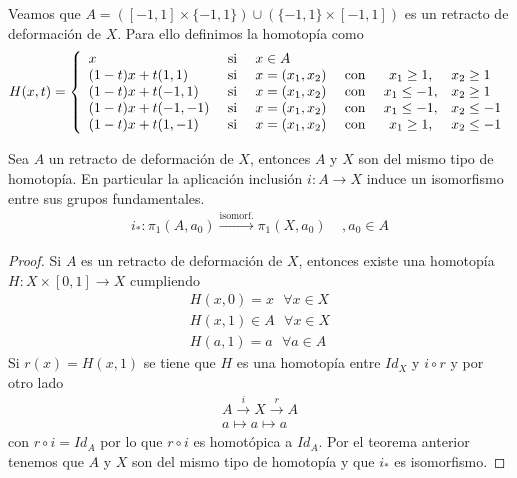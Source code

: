 \begin{ejemplo}
\begin{enumerate}
\begin{figure}[H]
\begin{tikzpicture}[scale=0.8]
            \end{tikzpicture}
        \end{figure}

        Veamos que $A=([-1,1]\times \{-1,1\})\cup (\{-1,1\}\times [-1,1])$ es un retracto de deformación de $X$. Para ello definimos la homotopía como 
        \begin{gather*}
            H(x,t) = \left\{
                \begin{array}{l c l l c l }
                    x & \text{ si } & x\in A\\
                    (1-t)x+t(1,1) & \text{ si } & x=(x_1,x_2)& \text{ con } &x_1\geq 1,& x_2\geq 1 \\
                    (1-t)x+t(-1,1) & \text{ si } & x=(x_1,x_2)& \text{ con } &x_1\leq -1,& x_2\geq 1 \\
                    (1-t)x+t(-1,-1) & \text{ si } & x=(x_1,x_2)& \text{ con } &x_1\leq - 1,& x_2\leq -1 \\
                    (1-t)x+t(1,-1) & \text{ si } & x=(x_1,x_2)& \text{ con } &x_1\geq 1,& x_2\leq -1 \\
                \end{array}
            \right.
        \end{gather*}
    \end{enumerate}
\end{ejemplo}

\begin{coro}
    Sea $A$ un retracto de deformación de $X$, entonces $A$ y $X$ son del mismo tipo de homotopía. En particular la aplicación inclusión $i:A\to X$ induce un isomorfismo entre sus grupos fundamentales.
    \begin{gather*}
        i_*:\pi_1(A,a_0) \overset{\text{isomorf.}}{\longrightarrow} \pi_1(X,a_0)\ \ \ \ \ ,a_0\in A
    \end{gather*}
    \begin{proof}
        Si $A$ es un retracto de deformación de $X$, entonces existe una homotopía $H:X\times[0,1]\to X$ cumpliendo
        \begin{gather*}
            H(x,0) = x \ \ \ \forall x \in X\\
            H(x,1) \in A \ \ \ \forall x \in X\\
            H(a,1) = a \ \ \ \forall a\in A
        \end{gather*}
        Si $r(x)=H(x,1)$ se tiene  que $H$ es una homotopía entre $Id_X$ y $i \circ r$ y por otro lado
        \begin{gather*}
            A \overset{i}{\to} X \overset{r}{\to} A\\
            a \mapsto a \mapsto a
        \end{gather*}
        con $r\circ i=Id_A$ por lo que $r\circ i$ es homotópica a $Id_A$. Por el teorema anterior tenemos que $A$ y $X$ son del mismo tipo de homotopía y que $i_*$ es isomorfismo.
    \end{proof}
\end{coro}

